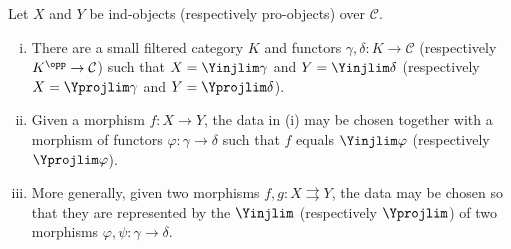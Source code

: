 \begin{lemma}\label{prop:ind-object-morphism}
	Let $X$ and $Y$ be ind-objects (respectively pro-objects) over $\mathcal{C}$.
	\begin{enumerate}[(i)]
		\item There are a small filtered category $K$ and functors
		$\gamma,\delta:K\to\mathcal{C}$ (respectively
		$K^{\opp}\to\mathcal{C}$) such that
		$X=\Yinjlim\gamma$ and $Y=\Yinjlim\delta$ (respectively
		$X=\Yprojlim\gamma$ and $Y=\Yprojlim\delta$).
		\item Given a morphism $f:X\to Y$, the data in (i) may be chosen together with a morphism of functors $\varphi:\gamma\to\delta$ such that $f$ equals $\Yinjlim\varphi$ (respectively $\Yprojlim\varphi$).
		\item More generally, given two morphisms $f,g:X\rightrightarrows Y$, the data may be chosen so that they are represented by the $\Yinjlim$ (respectively $\Yprojlim$) of two morphisms $\varphi,\psi:\gamma\to\delta$.
	\end{enumerate}
\end{lemma}
